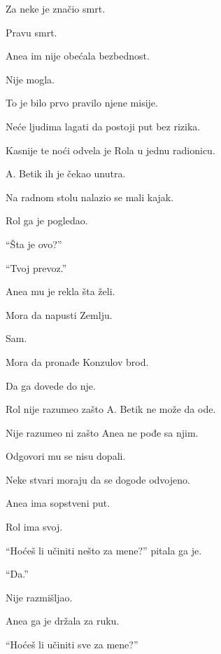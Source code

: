 \bigskip

Za neke je značio smrt.

Pravu smrt.

\bigskip

Anea im nije obećala bezbednost.

Nije mogla.

\bigskip

To je bilo prvo pravilo njene misije.

Neće ljudima lagati da postoji put bez rizika.

\bigskip

Kasnije te noći odvela je Rola u jednu radionicu.

A. Betik ih je čekao unutra.

Na radnom stolu nalazio se mali kajak.

\bigskip

Rol ga je pogledao.

``Šta je ovo?''

``Tvoj prevoz.''

\bigskip

Anea mu je rekla šta želi.

Mora da napusti Zemlju.

Sam.

\bigskip

Mora da pronađe Konzulov brod.

Da ga dovede do nje.

\bigskip

Rol nije razumeo zašto A. Betik ne može da ode.

Nije razumeo ni zašto Anea ne pođe sa njim.

\bigskip

Odgovori mu se nisu dopali.

\bigskip

Neke stvari moraju da se dogode odvojeno.

Anea ima sopstveni put.

Rol ima svoj.

\bigskip

``Hoćeš li učiniti nešto za mene?'' pitala ga je.

``Da.''

\bigskip

Nije razmišljao.

\bigskip

Anea ga je držala za ruku.

``Hoćeš li učiniti sve za mene?''

\bigskip

